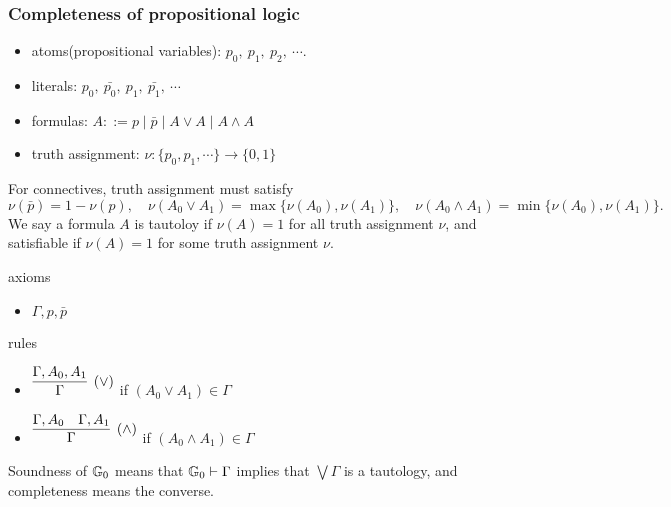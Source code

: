 \documentclass{../../../small}
\begin{document}
\subsubsection*{Completeness of propositional logic}
\begin{itemize}
\item atoms(propositional variables): $p_0,\ p_1,\ p_2,\ \cdots$.
\item literals: $p_0,\ \bar{p_0},\ p_1,\ \bar{p_1},\ \cdots$
\item formulas: $A::=p\mid\bar p\mid A\vee A\mid A\wedge A$
\item truth assignment: $\nu:\{p_0,p_1,\cdots\}\to\{0,1\}$
\end{itemize}

For connectives, truth assignment must satisfy
\[\nu(\bar p)=1-\nu(p),\quad\nu(A_0\vee A_1)=\max\{\nu(A_0),\nu(A_1)\},\quad\nu(A_0\wedge A_1)=\min\{\nu(A_0),\nu(A_1)\}.\]
We say a formula $A$ is tautoloy if $\nu(A)=1$ for all truth assignment $\nu$, and satisfiable if $\nu(A)=1$ for some truth assignment $\nu$.

\begin{defn*}
axioms
\begin{itemize}
\item $\Gamma,p,\bar p$
\end{itemize}
rules
\begin{itemize}
\item $\infer[(\vee)]{\Gamma}{\Gamma,A_0,A_1}$ if $(A_0\vee A_1)\in\Gamma$
\item $\infer[(\wedge)]{\Gamma}{\Gamma,A_0 & \Gamma,A_1}$ if $(A_0\wedge A_1)\in\Gamma$
\end{itemize}
\end{defn*}

Soundness of $\mathbb{G}_0$ means that $\mathbb{G}_0\vdash\Gamma$ implies that $\bigvee\Gamma$ is a tautology, and completeness means the converse.
\end{document}
